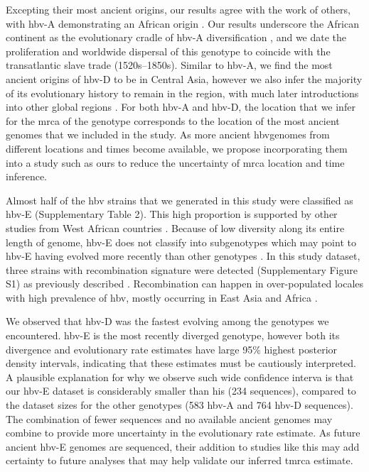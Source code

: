 Excepting their most ancient origins, our results agree with the work of others, with \gls{hbv}-A demonstrating an African origin \citep{pourkarim2011molecular,pourkarim2010novel,pourkarim2010are,toye2021hepatitis}.
Our results underscore the African continent as the evolutionary cradle of \gls{hbv}-A diversification \citep{andernach2009slave,toye2021hepatitis}, and we date the proliferation and worldwide dispersal of this genotype to coincide with the transatlantic slave trade (1520s--1850s).
Similar to \gls{hbv}-A, we find the most ancient origins of \gls{hbv}-D to be in Central Asia, however we also infer the majority of its evolutionary history to remain in the region, with much later introductions into other global regions \citep{pourkarim2014molecularidentification}.
For both \gls{hbv}-A and \gls{hbv}-D, the location that we infer for the \gls{mrca} of the genotype corresponds to the location of the most ancient genomes that we included in the study.
As more ancient \gls{hbv}genomes from different locations and times become available, we propose incorporating them into a study such as ours to reduce the uncertainty of \gls{mrca} location and time inference.

Almost half of the \gls{hbv} strains that we generated in this study were classified as \gls{hbv}-E (Supplementary Table 2).
This high proportion is supported by other studies from West African countries \citep{andernach2009slave,assih2018genetic}.
Because of low diversity along its entire length of genome, \gls{hbv}-E does not classify into subgenotypes \citep{forbi2010epidemic} which may point to \gls{hbv}-E having evolved more recently than other genotypes \citep{ingasia2020global}.
In this study dataset, three strains with recombination signature were detected (Supplementary Figure S1) as previously described \citep{mina2015genomic,pourkarim2010are,forbi2010epidemic,liu2020complete}.
Recombination can happen in over-populated locales with high prevalence of \gls{hbv}, mostly occurring in East Asia and Africa \citep{pourkarim2014molecularidentification,liu2020complete}.

We observed that \gls{hbv}-D was the fastest evolving among the genotypes we encountered.
\gls{hbv}-E is the most recently diverged genotype, however both its divergence and evolutionary rate estimates have large 95\% highest posterior density intervals, indicating that these estimates must be cautiously interpreted.
A plausible explanation for why we observe such wide confidence interva is that our \gls{hbv}-E dataset is considerably smaller than his (234 sequences), compared to the dataset sizes for the other genotypes (583 \gls{hbv}-A and 764 \gls{hbv}-D sequences).
The combination of fewer sequences and no available ancient genomes may combine to provide more uncertainty in the evolutionary rate estimate.
As future ancient \gls{hbv}-E genomes are sequenced, their addition to studies like this may add certainty to future analyses that may help validate our inferred \gls{tmrca} estimate.

